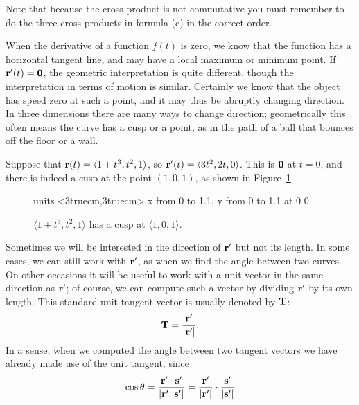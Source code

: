 Note that because the cross product is not commutative you must
remember to do the three cross products in formula (e) in the correct
order. 

When the derivative of a function $f(t)$ is zero, we know that the
function has a horizontal tangent line, and may have a local maximum
or minimum point. If ${\bf r}'(t)={\bf 0}$, the geometric
interpretation is quite different, though the interpretation in terms
of motion is similar. Certainly we know that the object has speed zero
at such a point, and it may thus be abruptly changing direction. In
three dimensions there are many ways to change direction;
geometrically this often means the curve has a cusp or a point, as in
the path of a ball that bounces off the floor or a wall.

\begin{example}{}{}
Suppose that ${\bf r}(t)=\langle 1+t^3,t^2,1\rangle$, so
${\bf r}'(t)=\langle 3t^2,2t,0\rangle$. This is $\bf 0$ at $t=0$, and
there is indeed a cusp at the point $(1,0,1)$, as
shown in Figure~\ref{fig:spacecurve cusp}.
\end{example}

\begin{figure}[H]
\centerline{
\vbox{\beginpicture
\normalgraphs
\setcoordinatesystem units <3truecm,3truecm>
\setplotarea x from 0 to 1.1, y from 0 to 1.1
 at 0 0
\endpicture}}
\caption{$\langle 1+t^3,t^2,1\rangle$ has a cusp at $\langle 1,0,1\rangle$. \label{fig:spacecurve cusp}}
\end{figure}

Sometimes we will be interested in the direction of ${\bf r}'$ but not
its length. In some cases, we can still work with ${\bf r}'$, as when
we find the angle between two curves. On other occasions it will be
useful to work with a unit vector in the same
direction as ${\bf r}'$; of course, we can compute such a vector by
dividing ${\bf r}'$ by its own length. This standard unit tangent
vector is usually denoted by ${\bf T}$:
$${\bf T}={{\bf r}'\over|{\bf r}'|}.$$
In a sense, when we computed the angle between two tangent vectors we
have already made use of the unit tangent, since
$$\cos\theta = {{\bf r}'\cdot{\bf s}'\over|{\bf r}'||{\bf s}'|}=
{{\bf r}'\over|{\bf r}'|}\cdot{{\bf s}'\over|{\bf s}'|}$$


